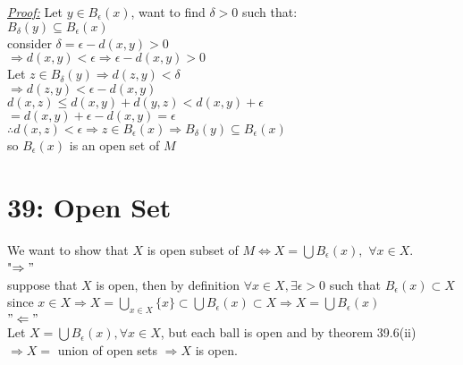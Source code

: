\documentclass{amsbook}
\begin{document}

\begin{tcolorbox}[enhanced,attach boxed title to top center={yshift=-3mm,yshifttext=-1mm},
  colback=blue!5!white,colframe=blue!75!black,colbacktitle=red!80!black,
  title=Prove that $B_\epsilon (x)$is open set:,fonttitle=\bfseries,
  boxed title style={size=small,colframe=red!50!black} ]
     \textit{\color{blue}\underline{Proof:}}
     Let $y\in B_\epsilon (x)$, want to find $\delta >0$ such that:\\
     $B_\delta (y)\subseteq B_\epsilon (x)$\\
     consider $\delta=\epsilon-d(x,y)>0$\\
     $\Rightarrow d(x,y)<\epsilon\Rightarrow \epsilon-d(x,y)>0$\\
     Let $z\in B_\delta (y)\Rightarrow d(z,y)<\delta$\\
     $\Rightarrow d(z,y)<\epsilon-d(x,y)$\\
     $d(x,z)\leq d(x,y)+d(y,z)<d(x,y)+\epsilon$\\
     $=d(x,y)+\epsilon-d(x,y)=\epsilon$\\
     $\therefore d(x,z)<\epsilon\Rightarrow z\in B_\epsilon (x)\Rightarrow B_\delta (y) \subseteq B_\epsilon 
     (x)$\\
     so $B_\epsilon (x)$ is an open set of $M$

\end{tcolorbox}


\section{39: Open Set}

\begin{tcolorbox}[enhanced,attach boxed title to top center={yshift=-3mm,yshifttext=-1mm},
  colback=blue!5!white,colframe=blue!75!black,colbacktitle=red!80!black,
  title={Exercise 39.9::},fonttitle=\bfseries,
  boxed title style={size=small,colframe=red!50!black} ]
{\color{red}{Proof:}}We want to show that $X$ is open subset of $M\iff X=\bigcup B_\epsilon(x),$ $\forall x\in 
X$.\\
{\color{red} "$\Rightarrow"$}\\
  suppose that $X$ is open, then by definition $\forall x\in X,\exists\epsilon>0$ such that 
  $B_\epsilon(x)\subset X$\\
  since $x\in X\Rightarrow X=\bigcup_{x\in X} \{x\}\subset\bigcup B_\epsilon(x)\subset X\Longrightarrow 
  X=\bigcup B_\epsilon(x)$\\
  {\color{red}$"\Leftarrow"$}\\
Let $ X=\bigcup B_\epsilon(x),\forall x\in X$, but each ball is open and by theorem 39.6(ii)\\
$\Rightarrow X=$ union of open sets $\Rightarrow X$ is open.
\end{tcolorbox}
\end{document}
